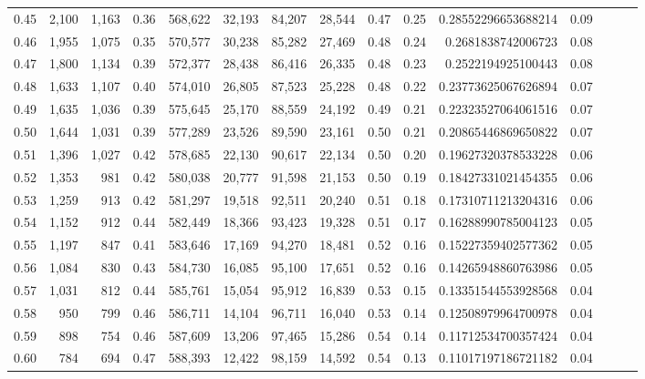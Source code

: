 \begin{tabular}{rrrrrrrrrrrrrrr}
0.45 &   2,100 &  1,163 &  0.36 &  568,622 &   32,193 &   84,207 &   28,544 &  0.47 &  0.25 &    0.28552296653688214 &      0.09 \\
0.46 &   1,955 &  1,075 &  0.35 &  570,577 &   30,238 &   85,282 &   27,469 &  0.48 &  0.24 &     0.2681838742006723 &      0.08 \\
0.47 &   1,800 &  1,134 &  0.39 &  572,377 &   28,438 &   86,416 &   26,335 &  0.48 &  0.23 &     0.2522194925100443 &      0.08 \\
0.48 &   1,633 &  1,107 &  0.40 &  574,010 &   26,805 &   87,523 &   25,228 &  0.48 &  0.22 &    0.23773625067626894 &      0.07 \\
0.49 &   1,635 &  1,036 &  0.39 &  575,645 &   25,170 &   88,559 &   24,192 &  0.49 &  0.21 &    0.22323527064061516 &      0.07 \\
0.50 &   1,644 &  1,031 &  0.39 &  577,289 &   23,526 &   89,590 &   23,161 &  0.50 &  0.21 &    0.20865446869650822 &      0.07 \\
0.51 &   1,396 &  1,027 &  0.42 &  578,685 &   22,130 &   90,617 &   22,134 &  0.50 &  0.20 &    0.19627320378533228 &      0.06 \\
0.52 &   1,353 &    981 &  0.42 &  580,038 &   20,777 &   91,598 &   21,153 &  0.50 &  0.19 &    0.18427331021454355 &      0.06 \\
0.53 &   1,259 &    913 &  0.42 &  581,297 &   19,518 &   92,511 &   20,240 &  0.51 &  0.18 &    0.17310711213204316 &      0.06 \\
0.54 &   1,152 &    912 &  0.44 &  582,449 &   18,366 &   93,423 &   19,328 &  0.51 &  0.17 &    0.16288990785004123 &      0.05 \\
0.55 &   1,197 &    847 &  0.41 &  583,646 &   17,169 &   94,270 &   18,481 &  0.52 &  0.16 &    0.15227359402577362 &      0.05 \\
0.56 &   1,084 &    830 &  0.43 &  584,730 &   16,085 &   95,100 &   17,651 &  0.52 &  0.16 &    0.14265948860763986 &      0.05 \\
0.57 &   1,031 &    812 &  0.44 &  585,761 &   15,054 &   95,912 &   16,839 &  0.53 &  0.15 &    0.13351544553928568 &      0.04 \\
0.58 &     950 &    799 &  0.46 &  586,711 &   14,104 &   96,711 &   16,040 &  0.53 &  0.14 &    0.12508979964700978 &      0.04 \\
0.59 &     898 &    754 &  0.46 &  587,609 &   13,206 &   97,465 &   15,286 &  0.54 &  0.14 &    0.11712534700357424 &      0.04 \\
0.60 &     784 &    694 &  0.47 &  588,393 &   12,422 &   98,159 &   14,592 &  0.54 &  0.13 &    0.11017197186721182 &      0.04 \\

\end{tabular}
